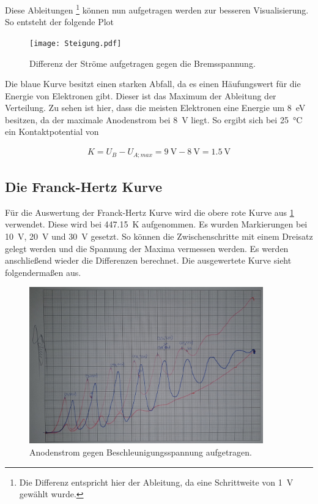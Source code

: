 \noindent Diese Ableitungen \footnote{Die Differenz entspricht hier der Ableitung, da eine Schrittweite von \qty{1}{\volt} gewählt wurde.} 
können nun aufgetragen werden zur besseren Visualisierung. So entsteht der folgende Plot

\begin{figure}[H]
    \centering
    \texttt{[image: Steigung.pdf]}
    \caption{Differenz der Ströme aufgetragen gegen die Bremsspannung.}
\end{figure}

\noindent Die blaue Kurve besitzt einen starken Abfall, da es einen Häufungswert für die Energie von Elektronen gibt. Dieser 
ist das Maximum der Ableitung der Verteilung.
Zu sehen ist hier, dass die meisten Elektronen eine Energie um \qty{8}{\electronvolt} besitzen, da der maximale Anodenstrom 
bei \qty{8}{\volt} liegt. So ergibt sich 
bei \qty{25}{\celsius} ein Kontaktpotential von 

\begin{align*}
    K=U_B - U_{A; max} = \qty{9}{\volt} - \qty{8}{\volt} = \qty{1.5}{\volt}
\end{align*}


\subsection{Die Franck-Hertz Kurve}
Für die Auswertung der Franck-Hertz Kurve wird die obere rote Kurve aus \ref{fig:Besch} verwendet. Diese wird bei \qty{447.15}{\kelvin} 
aufgenommen. Es wurden Markierungen bei \qty{10}{\volt}, \qty{20}{\volt} und \qty{30}{\volt} gesetzt. So können die Zwischenschritte 
mit einem Dreisatz gelegt werden und die Spannung der Maxima vermessen werden. Es werden anschließend wieder die Differenzen berechnet. 
Die ausgewertete Kurve sieht folgendermaßen aus.

\begin{figure}[H]
    \centering
    \includegraphics[width=0.9\textwidth]{content/FranckHertz.jpg}
    \caption{Anodenstrom gegen Beschleunigungsspannung aufgetragen.}
    \label{fig:Besch}
\end{figure}

